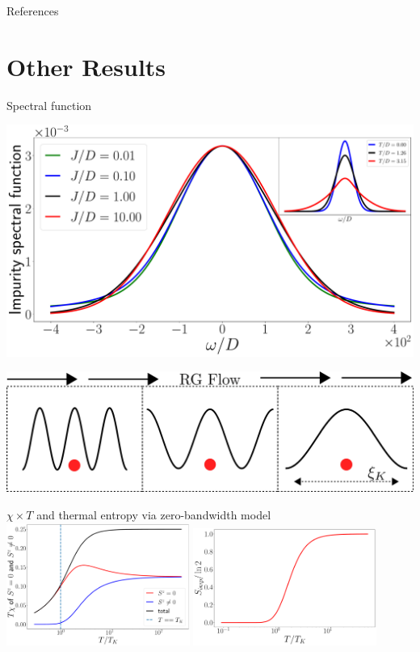 \documentclass[aspectratio=169]{beamer}
\begin{document}
\begin{frame}{References}
\printbibliography
\end{frame}

\section{Other Results}
\begin{frame}[noframenumbering]{Spectral function}
\begin{minipage}{0.45\textwidth}
\includegraphics[width=\textwidth]{figures/kondo_spec_func.pdf}
\end{minipage}
\begin{minipage}{0.45\textwidth}
\includegraphics[width=\textwidth]{figures/Kondo_length.pdf}
\end{minipage}
\end{frame}

\begin{frame}[noframenumbering]{\(\chi \times T\) and thermal entropy via zero-bandwidth model}
	\includegraphics[width=0.45\textwidth]{figures/chi_times_T_parts.pdf}
	\includegraphics[width=0.45\textwidth]{figures/entropy_therm.pdf}
\end{frame}
\end{document}
